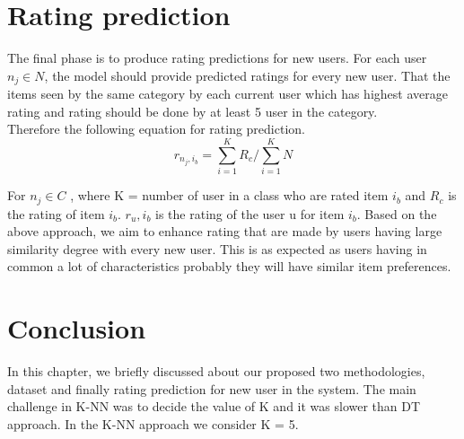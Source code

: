 \documentclass[document.tex]{subfiles}
\begin{document}
\section{Rating prediction}
The final phase is to produce rating predictions for new users. For each user $n_j \in N$, the model should provide predicted ratings for every new user. That the items seen by the same category by each current user which has highest average rating and rating should be done by at least 5 user in the category.\\
Therefore the following equation for rating prediction.
\begin{equation}
r_{n_j,i_b} = \sum_{i=1}^K R_c / \sum_{i=1}^K N
\label{ratingPrediction}
\end{equation}

For $n_j \in C$ , where K = number of user in a class who are rated item $i_b$ and $R_c$ is the rating of item $i_b$.
$r_u,i_b$ is the rating of the user u for item $i_b$. Based on the above approach, we aim to enhance rating that are made by users having large similarity degree with every new user. This is as expected as users having in common a lot of characteristics probably they will have similar item preferences.


\section{Conclusion}
	In this chapter, we briefly discussed about our proposed two methodologies, dataset and finally rating prediction for new user in the system. The main challenge in K-NN was to decide the value of K and it was slower than DT approach. In the K-NN approach we consider K = 5.
		
\end{document}
